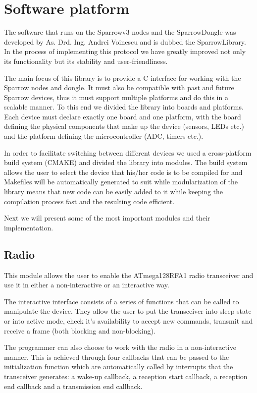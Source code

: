 
\chapter{Software platform}

The software that runs on the Sparrowv3 nodes and the SparrowDongle was
developed by As. Drd. Ing. Andrei Voinescu and is dubbed the SparrowLibrary.
In the process of implementing this protocol we have greatly improved not only
its functionality but its stability and user-friendliness.

The main focus of this library is to provide a C interface for working with the
Sparrow nodes and dongle. It must also be compatible with past and future
Sparrow devices, thus it must support multiple platforms and do this in a
scalable manner. To this end we divided the library into boards and platforms.
Each device must declare exactly one board and one platform, with the board
defining the physical components that make up the device (sensors, LEDs etc.)
and the platform defining the microcontroller (ADC, timers etc.). 

In order to facilitate switching between different devices we used a
cross-platform build system (CMAKE) and divided the library into modules. The
build system allows the user to select the device that his/her code is to be
compiled for and Makefiles will be automatically generated to suit while
modularization of the library means that new code can be easily added to it
while keeping the compilation process fast and the resulting code efficient.

Next we will present some of the most important modules and their
implementation.

\section{Radio}

This module allows the user to enable the ATmega128RFA1 radio transceiver and
use it in either a non-interactive or an interactive way. 

The interactive interface consists of a series of functions that can be called
to manipulate the device. They allow the user to put the transceiver into 
sleep state or into active mode, check it's availability to accept new
commands, transmit and receive a frame (both blocking and non-blocking).

The programmer can also choose to work with the radio in a non-interactive
manner. This is achieved through four callbacks that can be passed to the
initialization function which are automatically called by interrupts that
the transceiver generates: a wake-up callback, a reception start callback, a
reception end callback and a transmission end callback. 

